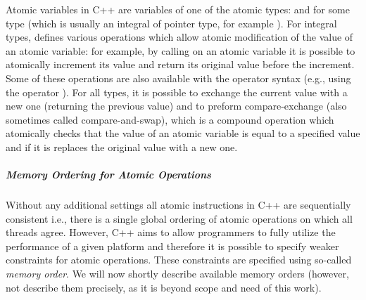 Atomic variables in C++ are variables of one of the atomic types:
 and  for some type  (which is
usually an integral of pointer type, for example ).
For integral types,  defines various operations which allow
atomic modification of the value of an atomic variable: for example, by calling
 on an atomic variable it is possible to atomically increment
its value and return its original value before the increment.
Some of these operations are also available with the operator syntax (e.g.,
using the operator \cpp{+=}).
For all types, it is possible to exchange the current value with a new one
(returning the previous value) and to preform compare-exchange (also sometimes
called compare-and-swap), which is a compound operation which atomically checks
that the value of an atomic variable is equal to a specified value and if it is
replaces the original value with a new one.

\subparagraph{Memory Ordering for Atomic Operations} \label{sec:prelim:cppmemord}

Without any additional settings all atomic instructions in C++ are sequentially
consistent i.e., there is a single global ordering of atomic operations on
which all threads agree.
However, C++ aims to allow programmers to fully utilize the performance of a
given platform and therefore it is possible to specify weaker constraints for
atomic operations.
These constraints are specified using so-called \emph{memory order}.
We will now shortly describe available memory orders (however, not describe
them precisely, as it is beyond scope and need of this work).

